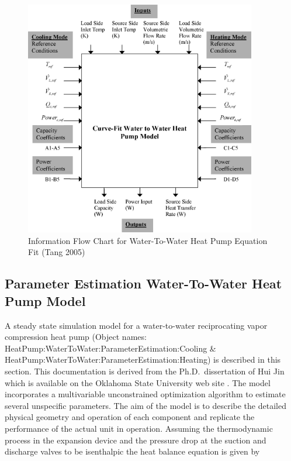 \begin{figure}[hbtp] %
\centering
\includegraphics[width=0.9\textwidth, height=0.9\textheight, keepaspectratio=true]{media/image5290.png}
\caption{  Information Flow Chart for Water-To-Water Heat Pump Equation Fit (Tang 2005) \protect \label{fig:information-flow-chart-for-water-to-water}}
\end{figure}

\subsection{Parameter Estimation Water-To-Water Heat Pump Model}\label{parameter-estimation-water-to-water-heat-pump-model}

A steady state simulation model for a water-to-water reciprocating vapor compression heat pump (Object names: HeatPump:WaterToWater:ParameterEstimation:Cooling \& HeatPump:WaterToWater:ParameterEstimation:Heating) is described in this section. This documentation is derived from the Ph.D.~dissertation of Hui Jin which is available on the Oklahoma State University web site . The model incorporates a multivariable unconstrained optimization algorithm to estimate several unspecific parameters. The aim of the model is to describe the detailed physical geometry and operation of each component and replicate the performance of the actual unit in operation. Assuming the thermodynamic process in the expansion device and the pressure drop at the suction and discharge valves to be isenthalpic the heat balance equation is given by

